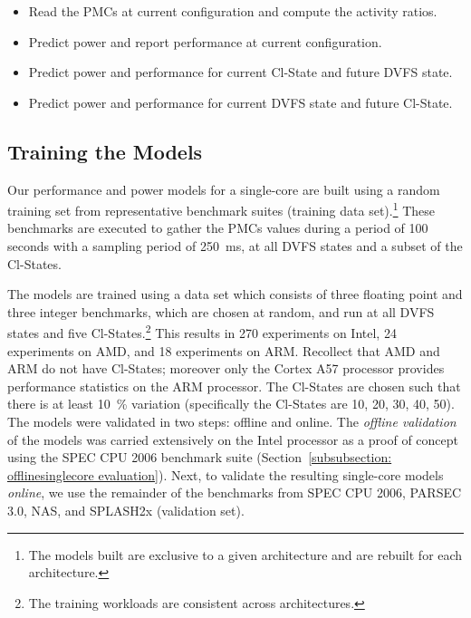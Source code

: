 \begin{itemize}

    \item[{\small \circled{1}}] Read the PMCs at current configuration and compute the activity ratios.

    \item[{\small \circled{2}}] Predict power and report performance at current configuration.

    \item[{\small \circled{3}}] Predict power and performance for current Cl-State and future DVFS state. 

    \item[{\small \circled{4}}] Predict power and performance for current DVFS state and future Cl-State. 

\end{itemize}

\subsection{Training the Models} 
\label{subsec: training} 

 Our performance and power models for a single-core are built using a random
training set from representative benchmark suites (training data set).\footnote{The models
built are exclusive to a given architecture and are rebuilt for each architecture.} These
benchmarks are executed to gather the PMCs values during a period of 100 seconds with a
sampling period of \SI{250}{\milli\second}, at all DVFS states and a subset of the
Cl-States.

 The models are trained using a data set which consists of three floating
point and three integer benchmarks, which are chosen at random, and run at all DVFS states
and five Cl-States.\footnote{The training workloads are consistent across architectures.}
This results in 270 experiments on Intel, 24 experiments on AMD, and 18 experiments on
ARM.  Recollect that AMD and ARM do not have Cl-States; moreover only the Cortex A57
processor provides performance statistics on the ARM processor. The Cl-States are chosen
such that there is at least \SI{10}{\percent} variation (specifically the Cl-States are
10, 20, 30, 40, 50).  The models were validated in two steps: offline and online. The
\textit{offline validation} of the models was carried extensively on the Intel processor
as a proof of concept using the SPEC CPU 2006 benchmark suite (Section~\ref{subsubsection:
offlinesinglecore evaluation}).  Next, to validate the resulting single-core models
\textit{online}, we use the remainder of the benchmarks from SPEC CPU 2006, PARSEC 3.0,
NAS, and SPLASH2x (validation set). 

